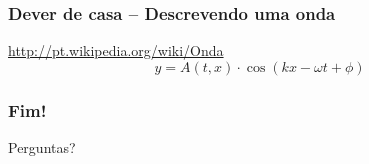 \begin{frame}
  \frametitle{Dever de casa -- Descrevendo uma onda}
    \begin{block}{}
        \url{http://pt.wikipedia.org/wiki/Onda}
        \[
          y=A(t,x)\cdot \cos (kx - \omega t + \phi)
        \]
    \end{block}
\end{frame}


{%
\begin{frame}
    \frametitle{Fim!}
        \begin{center}
            Perguntas?
        \end{center}
\vspace*{10cm}
\end{frame}
}


